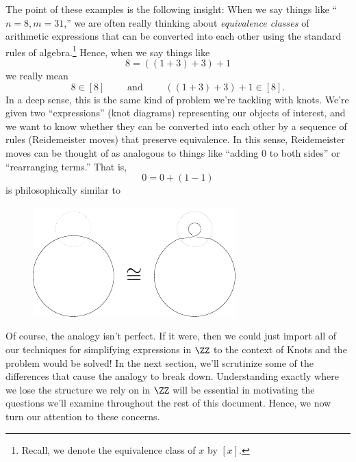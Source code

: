 The point of these examples is the following insight: When we say
things like ``$n=8, m=31$,'' we are often really thinking about
\emph{equivalence classes} of arithmetic expressions that can be
converted into each other using the standard rules of
algebra.\footnote{Recall, we denote the equivalence class of $x$ by
  $[x]$.} Hence, when we say things like
\[
  8 = ((1 + 3) + 3) + 1
\]
we really mean
\[
  8 \in [8] \qquad\text{ and }\qquad ((1 + 3) + 3) + 1 \in [8].
\]
In a deep sense, this is the same kind of problem we're tackling with
knots. We're given two ``expressions'' (knot diagrams) representing
our objects of interest, and we want to know whether they can be
converted into each other by a sequence of rules (Reidemeister moves)
that preserve equivalence. In this sense, Reidemeister moves can be
thought of as analogous to things like ``adding $0$ to both sides'' or
``rearranging terms.'' That is,
\[
  0 = 0 + (1 - 1)
\]
is philosophically similar to
\begin{figure}[H]
  \centering
  \includegraphics{figures/intro/add-one.pdf}
\end{figure}
Of course, the analogy isn't perfect. If it were, then we could just
import all of our techniques for simplifying expressions in $\ZZ$ to
the context of Knots and the problem would be solved! In the next
section, we'll scrutinize some of the differences that cause the
analogy to break down. Understanding exactly where we lose the
structure we rely on in $\ZZ$ will be essential in motivating the
questions we'll examine throughout the rest of this document. Hence,
we now turn our attention to these concerns.


